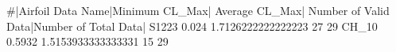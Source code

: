 #|Airfoil Data Name|Minimum CL_Max| Average CL_Max| Number of Valid Data|Number of Total Data|
S1223 0.024 1.7126222222222223 27 29
CH_10 0.5932 1.5153933333333331 15 29

